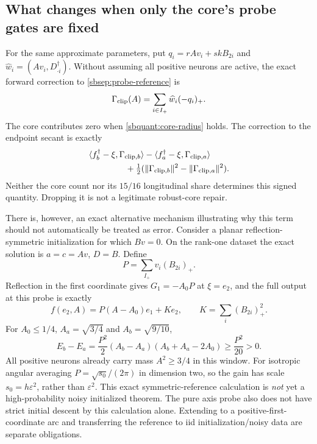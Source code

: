 \documentclass[11pt]{article}
\theoremstyle{remark}
\begin{document}
\subsection{What changes when only the core's probe gates are fixed}

For the same approximate parameters, put
$q_i=rAv_i+skB_{2i}$ and $\widehat w_i=(Av_i,D^\dagger_{\cdot i})$.
Without assuming all positive neurons are active, the exact forward
correction to \eqref{sbsep:probe-reference} is
\begin{equation}\label{sbquant:clipping-correction}
 \Gamma_{\rm clip}(A)=\sum_{i\in I_+}\widehat w_i(-q_i)_+.
\end{equation}
The core contributes zero when \eqref{sbquant:core-radius} holds.
The correction to the endpoint secant is exactly
\begin{align}\label{sbquant:clipping-secant}
 &\langle f_b^\dagger-\xi,\Gamma_{{\rm clip},b}\rangle
 -\langle f_a^\dagger-\xi,\Gamma_{{\rm clip},a}\rangle\\
 &\hspace{15mm}
 +\tfrac12(\|\Gamma_{{\rm clip},b}\|^2-
                    \|\Gamma_{{\rm clip},a}\|^2).\nonumber
\end{align}
Neither the core count nor its $15/16$ longitudinal share determines this
signed quantity. Dropping it is not a legitimate robust-core repair.

There is, however, an exact alternative mechanism illustrating why this
term should not automatically be treated as error. Consider a planar
reflection-symmetric initialization for which $Bv=0$. On the rank-one
dataset the exact solution is $a=c=Av$, $D=B$. Define
\[
 P=\sum_{I_+}v_i(B_{2i})_+.
\]
Reflection in the first coordinate gives $G_1=-A_0P$ at $\xi=e_2$,
and the full output at this probe is exactly
\begin{equation}\label{sbquant:coherent-output}
 f(e_2,A)=P(A-A_0)e_1+K e_2,
 \qquad K=\sum_i(B_{2i})_+^2.
\end{equation}
For $A_0\le1/4$, $A_a=\sqrt{3/4}$ and $A_b=\sqrt{9/10}$,
\begin{equation}\label{sbquant:coherent-rebound}
 E_b-E_a
 =\frac{P^2}{2}(A_b-A_a)(A_b+A_a-2A_0)
 \ge\frac{P^2}{20}>0.
\end{equation}
All positive neurons already carry mass $A^2\ge3/4$ in this window.
For isotropic angular averaging $P=\sqrt{s_0}/(2\pi)$ in dimension two,
so the gain has scale $s_0=h\varepsilon^2$, rather than $\varepsilon^2$.
This exact symmetric-reference calculation is \emph{not} yet a
high-probability noisy initialized theorem. The pure axis probe also
does not have strict initial descent by this calculation alone. Extending
to a positive-first-coordinate arc and transferring the reference to iid
initialization/noisy data are separate obligations.
\end{document}
